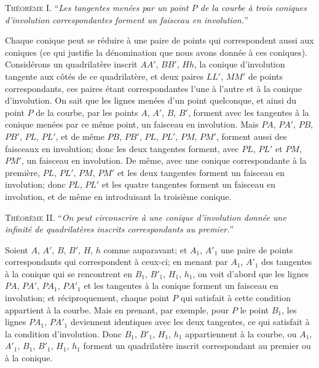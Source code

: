 \documentclass[12pt,a4paper]{article}
\begin{document}
\medskip
\textsc{Th\'eor\`eme I.} ``\textit{Les tangentes men\'ees par un point $P$ de la courbe \`a trois coniques d'involution correspondantes forment un faisceau en involution.}''

\newpage
\setcounter{page}{191}

Chaque conique peut se r\'eduire \`a une paire de points qui correspondent aussi aux coniques (ce qui justifie la d\'enomination que nous avons donn\'ee \`a ces coniques). Consid\'erons un quadrilat\`ere inscrit $AA'$, $BB'$, $Hh$, la conique d'involution tangente aux c\^ot\'es de ce quadrilat\`ere, et deux paires $LL'$, $MM'$ de points correspondants, ces paires \'etant correspondantes l'une \`a l'autre et \`a la conique d'involution. On sait que les lignes men\'ees d'un point quelconque, et ainsi du point $P$ de la courbe, par les points $A$, $A'$, $B$, $B'$, forment avec les tangentes \`a la conique men\'ees par ce m\^eme point, un faisceau en involution. Mais $PA$, $PA'$, $PB$, $PB'$, $PL$, $PL'$, et de m\^eme $PB$, $PB'$, $PL$, $PL'$, $PM$, $PM'$, forment aussi des faisceaux en involution; donc les deux tangentes forment, avec $PL$, $PL'$ et $PM$, $PM'$, un faisceau en involution. De m\^eme, avec une conique correspondante \`a la premi\`ere, $PL$, $PL'$, $PM$, $PM'$ et les deux tangentes forment un faisceau en involution; donc $PL$, $PL'$ et les quatre tangentes forment un faisceau en involution, et de m\^eme en introduisant la troisi\`eme conique.

\medskip
\textsc{Th\'eor\`eme II.} ``\textit{On peut circonscrire \`a une conique d'involution donn\'ee une infinit\'e de quadrilat\`eres inscrits correspondants au premier.}''

Soient $A$, $A'$, $B$, $B'$, $H$, $h$ comme auparavant; et $A_1$, $A'_1$ une paire de points correspondants qui correspondent \`a ceux-ci; en menant par $A_1$, $A'_1$ des tangentes \`a la conique qui se rencontrent en $B_1$, $B'_1$, $H_1$, $h_1$, on voit d'abord que les lignes $PA$, $PA'$, $PA_1$, $PA'_1$ et les tangentes \`a la conique forment un faisceau en involution; et r\'eciproquement, chaque point $P$ qui satisfait \`a cette condition appartient \`a la courbe. Mais en prenant, par exemple, pour $P$ le point $B_1$, les lignes $PA_1$, $PA'_1$ deviennent identiques avec les deux tangentes, ce qui satisfait \`a la condition d'involution. Donc $B_1$, $B'_1$, $H_1$, $h_1$ appartiennent \`a la courbe, ou $A_1$, $A'_1$, $B_1$, $B'_1$, $H_1$, $h_1$ forment un quadrilat\`ere inscrit correspondant au premier ou \`a la conique.
\end{document}
